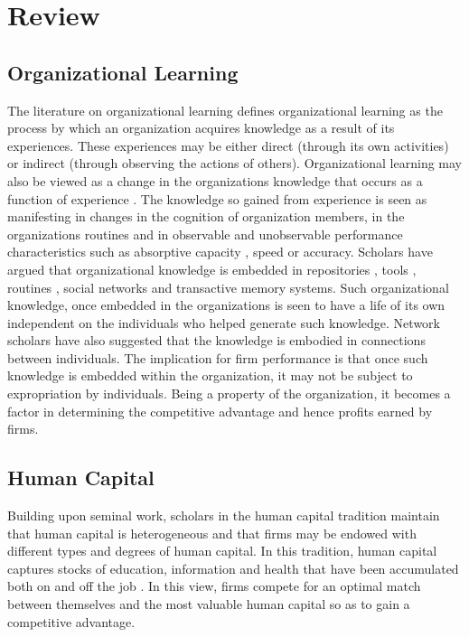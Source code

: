 \documentclass[12pt,letterpaper]{article}
\begin{document}
\section{Review}
\subsection{Organizational Learning}
The literature on organizational learning defines organizational learning as the process by which an organization acquires knowledge as a result of its experiences. These experiences may be either direct (through its own activities) or indirect (through observing the actions of others). Organizational learning may also be viewed as a change in the organization\textquotesingle s knowledge that occurs as a function of experience \citep{Levitt1988}.  The knowledge so gained from experience is seen as manifesting in changes in the cognition of organization members, in the organization\textquotesingle s routines and in observable and unobservable performance characteristics such as absorptive capacity \citep{Cohen1990}, speed or accuracy. Scholars have argued that organizational knowledge is embedded in repositories \citep{Walsh1991}, tools \citep{Kogut1992}, routines \cite{Nelson1982}, social networks and transactive memory systems. Such organizational knowledge, once embedded in the organizations is seen to have a life of its own independent on the individuals who helped generate such knowledge. Network scholars have also suggested that the knowledge is embodied in connections between individuals. The implication for firm performance is that once such knowledge is embedded within the organization, it may not be subject to expropriation by individuals. Being a property of the organization, it becomes a factor in determining the competitive advantage and hence profits earned by firms.  

\subsection{Human Capital}
Building upon \cite{Becker1962} seminal work, scholars in the human capital tradition maintain that human capital is heterogeneous and that firms may be endowed with different types and degrees of human capital. In this tradition, human capital captures stocks of education, information and health that have been accumulated both on and off the job \citep{Becker1962}. In this view, firms compete for an optimal match between themselves and the most valuable human capital so as to gain a competitive advantage. 
\end{document}
